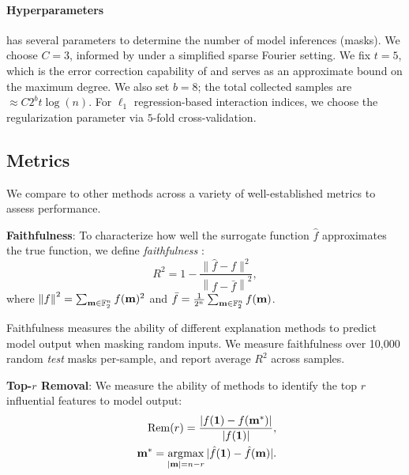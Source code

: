\vspace{-6pt}
\paragraph{Hyperparameters} \SpecExp{} has several parameters to determine the number of model inferences (masks). We choose $C=3$, informed by \citet{li2015spright} under a simplified sparse Fourier setting. We fix $t = 5$, which is the error correction capability of \SpecExp{} and serves as an approximate bound on the maximum degree. 
%
We also set $b=8$; the total collected samples are $\approx C2^bt \log(n)$. 
%
For $\ell_1$ regression-based interaction indices, we choose the regularization parameter via $5$-fold cross-validation. 




\vspace{-3pt}
\subsection{Metrics}


We compare \SpecExp{} to other methods across a variety of well-established metrics to assess performance.

\textbf{Faithfulness}: To characterize how well the surrogate function $\hat{f}$ approximates the true function, we define \emph{faithfulness} \cite{zhang2023trade}:
\vspace{-3pt}
\begin{equation}
    R^2 = 1 -  \frac{\lVert \hat{f} - f \rVert^2}{\left\lVert f - \bar{f} \right\rVert^2},
\end{equation}
where $\left\lVert f  \right\rVert^2 = \sum_{\mathbf m \in \mathbb F_2^n}f(\mathbf m)^2$ and $\bar{f} = \frac{1}{2^n} \sum_{\mathbf m \in \mathbb F_2^n}f(\mathbf m)$.

Faithfulness measures the ability of different explanation methods to predict model output when masking random inputs. 
%
We measure faithfulness over 10,000 random \emph{test} masks per-sample, and report average $R^2$ across samples. 
%

\textbf{Top-$r$ Removal}: We measure the ability of methods to identify the top $r$ influential features to model output:
\vspace{-2pt}
\begin{align}
\begin{split}
    \mathrm{Rem}(r) = \frac{|f(\boldsymbol{1}) - f(\mathbf m^*)|}{|f(\boldsymbol{1})|}, \\
    \;\mathbf m^* = \operatorname*{\arg\!\max} \limits_{\left\lvert \mathbf m \right\rvert = n-r}|\hat{f}(\boldsymbol{1}) - \hat{f}(\mathbf m)|.
\end{split}
\end{align}
\vspace{-8pt}


